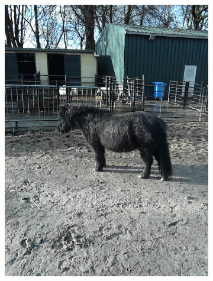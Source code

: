 \documentclass{l4proj}
\begin{document}
\begin{figure}[ht]
\begin{subfigure}[h!]{0.18\textwidth}
    \includegraphics[width=\textwidth, trim={0cm 2.5cm 0cm 2.5cm}, clip]{images/dataset/pony/rgb.png}

\end{subfigure}
\end{figure}
\end{document}
